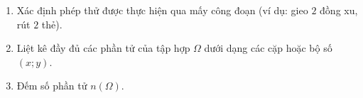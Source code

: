 \begin{enumerate}
\item Xác định phép thử được thực hiện qua mấy công đoạn (ví dụ: gieo $2$ đồng xu, rút $2$ thẻ).
\item Liệt kê đầy đủ các phần tử của tập hợp $\Omega$ dưới dạng các cặp hoặc bộ số $(x; y)$.
\item Đếm số phần tử $n(\Omega)$.
\end{enumerate}

